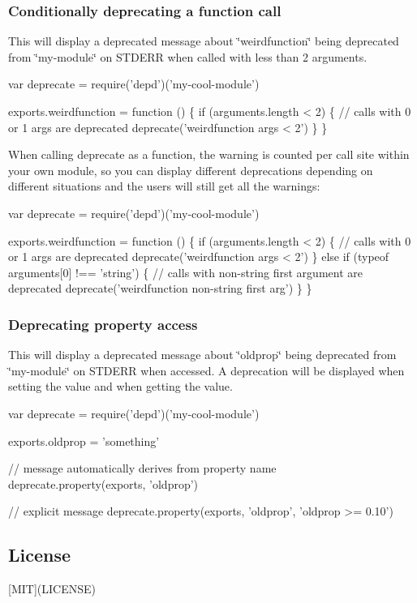 \subsubsection*{Conditionally deprecating a function call}

This will display a deprecated message about \char`\"{}weirdfunction\char`\"{} being deprecated from \char`\"{}my-\/module\char`\"{} on S\+T\+D\+E\+RR when called with less than 2 arguments.


\begin{DoxyCode}
var deprecate = require('depd')('my-cool-module')

exports.weirdfunction = function () \{
  if (arguments.length < 2) \{
    // calls with 0 or 1 args are deprecated
    deprecate('weirdfunction args < 2')
  \}
\}
\end{DoxyCode}


When calling {\ttfamily deprecate} as a function, the warning is counted per call site within your own module, so you can display different deprecations depending on different situations and the users will still get all the warnings\+:


\begin{DoxyCode}
var deprecate = require('depd')('my-cool-module')

exports.weirdfunction = function () \{
  if (arguments.length < 2) \{
    // calls with 0 or 1 args are deprecated
    deprecate('weirdfunction args < 2')
  \} else if (typeof arguments[0] !== 'string') \{
    // calls with non-string first argument are deprecated
    deprecate('weirdfunction non-string first arg')
  \}
\}
\end{DoxyCode}


\subsubsection*{Deprecating property access}

This will display a deprecated message about \char`\"{}oldprop\char`\"{} being deprecated from \char`\"{}my-\/module\char`\"{} on S\+T\+D\+E\+RR when accessed. A deprecation will be displayed when setting the value and when getting the value.


\begin{DoxyCode}
var deprecate = require('depd')('my-cool-module')

exports.oldprop = 'something'

// message automatically derives from property name
deprecate.property(exports, 'oldprop')

// explicit message
deprecate.property(exports, 'oldprop', 'oldprop >= 0.10')
\end{DoxyCode}


\subsection*{License}

\mbox{[}M\+IT\mbox{]}(L\+I\+C\+E\+N\+SE) 